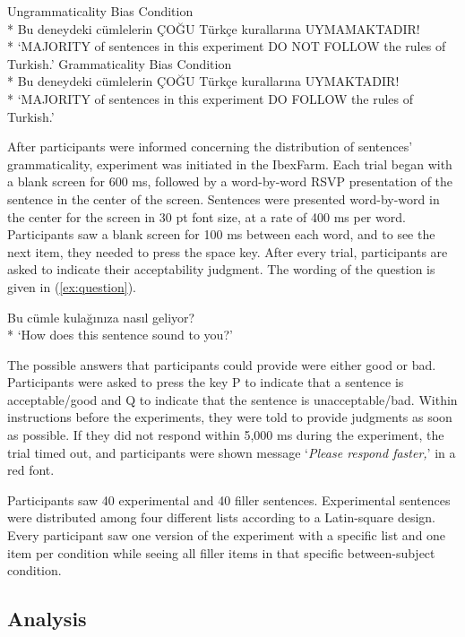 \ea \label{ex:biasManip}
  \ea \label{ex:biasUngManip} {Ungrammaticality Bias Condition}\\*
  Bu deneydeki c\"umlelerin \c{C}O\u{G}U T\"urk\c{c}e kurallar{\i}na UYMAMAKTADIR!\\*
  `MAJORITY of sentences in this experiment DO NOT FOLLOW the rules of Turkish.'
  \ex \label{ex:biasGrManip} {Grammaticality Bias Condition}\\*
  Bu deneydeki c\"umlelerin \c{C}O\u{G}U T\"urk\c{c}e kurallar{\i}na UYMAKTADIR!\\*
  `MAJORITY of sentences in this experiment DO FOLLOW the rules of Turkish.'
  \z
\z

After participants were informed concerning the distribution of sentences' grammaticality, experiment was initiated in the IbexFarm. Each trial began with a blank screen for 600 ms, followed by a word-by-word RSVP presentation of the sentence in the center of the screen. Sentences were presented word-by-word in the center for the screen in 30 pt font size, at a rate of 400 ms per word. Participants saw a blank screen for 100 ms between each word, and to see the next item, they needed to press the space key. After every trial, participants are asked to indicate their acceptability judgment. The wording of the question is given in (\ref{ex:question}). 

\ea \label{ex:question}
Bu c\"umle kula\u{g}{\i}n{\i}za nas{\i}l geliyor? \\*
`How does this sentence sound to you?'
\z

The possible answers that participants could provide were either good or bad. Participants were asked to press the key P to indicate that a sentence is acceptable/good and Q to indicate that the sentence is unacceptable/bad. Within instructions before the experiments, they were told to provide judgments as soon as possible. If they did not respond within 5,000 ms during the experiment, the trial timed out, and participants were shown message `\emph{Please respond faster,}' in a red font.

Participants saw 40 experimental and 40 filler sentences. Experimental sentences were distributed among four different lists according to a Latin-square design. Every participant saw one version of the experiment with a specific list and one item per condition while seeing all filler items in that specific between-subject condition.


\subsection{Analysis}


